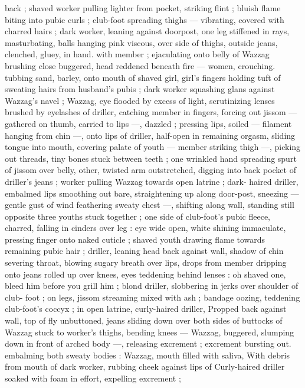 back ; shaved worker pulling lighter from pocket, striking flint ; bluish 
flame biting into pubic curls ; club-foot spreading thighs --- 
vibrating, covered with charred hairs ; dark worker, leaning against 
doorpost, one leg stiffened in rays, masturbating, balls hanging pink 
viscous, over side of thighs, outside jeans, clenched, gluey, in hand. 
with member ; ejaculating onto belly of Wazzag brushing close 
buggered, head reddened beneath fire --- women, crouching. 
tubbing sand, barley, onto mouth of shaved girl, girl's fingers 
holding tuft of sweating hairs from husband's pubis ; dark worker 
squashing glans against Wazzag's navel ; Wazzag, eye flooded by 
excess of light, scrutinizing lenses brushed by eyelashes of driller, 
catching member in fingers, forcing out jissom --- gathered on 
thumb, carried to lips ---, dazzled ; pressing lips, soiled --- filament 
hanging from chin ---, onto lips of driller, half-open in remaining 
orgasm, sliding tongue into mouth, covering palate of youth --- 
member striking thigh ---, picking out threads, tiny bones stuck 
between teeth ; one wrinkled hand spreading spurt of jissom over 
belly, other, twisted arm outstretched, digging into back pocket of 
driller's jeans ; worker pulling Wazzag towards open latrine ; dark- 
haired driller, embalmed lips smoothing out bare, straightening up 
along door-post, sneezing --- gentle gust of wind feathering sweaty 
chest ---, shifting along wall, standing still opposite three youths 
stuck together ; one side of club-foot's pubic fleece, charred, falling 
in cinders over leg : eye wide open, white shining immaculate, 
pressing finger onto naked cuticle ; shaved youth drawing flame 
towards remaining pubic hair ; driller, leaning head back against wall, 
shadow of chin severing throat, blowing sugary breath over lips, 
drops from member dripping onto jeans rolled up over knees, eyes 
teddening behind lenses : {\gl}{\thd}oh shaved one, bleed him before you 
grill him{\thd}{\gr} ; blond driller, slobbering in jerks over shoulder of club- 
foot ; on legs, jissom streaming mixed with ash ; bandage oozing, 
teddening club-foot's coccyx ; in open latrine, curly-haired driller, 
Propped back against wall, top of fly unbuttoned, jeans sliding down 
over both sides of buttocks of Wazzag stuck to worker's thighs, 
bending knees --- Wazzag, buggered, slumping down in front of 
arched body ---, releasing excrement ; excrement bursting out. 
embalming both sweaty bodies : Wazzag, mouth filled with saliva, 
With debris from mouth of dark worker, rubbing cheek against lips of 
Curly-haired driller soaked with foam in effort, expelling excrement ; 
